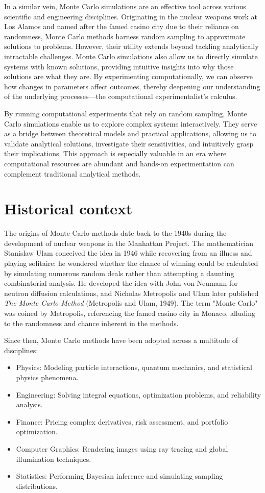 \documentclass[final,5p,times,twocolumn,authoryear]{elsarticle}
\begin{document}
In a similar vein, Monte Carlo simulations are an effective tool across various scientific and engineering disciplines. Originating in the nuclear weapons work at Los Alamos and named after the famed casino city due to their reliance on randomness, Monte Carlo methods harness random sampling to approximate solutions to problems. However, their utility extends beyond tackling analytically intractable challenges. Monte Carlo simulations also allow us to directly simulate systems with known solutions, providing intuitive insights into why those solutions are what they are. By experimenting computationally, we can observe how changes in parameters affect outcomes, thereby deepening our understanding of the underlying processes—the computational experimentalist's calculus.

By running computational experiments that rely on random sampling, Monte Carlo simulations enable us to explore complex systems interactively. They serve as a bridge between theoretical models and practical applications, allowing us to validate analytical solutions, investigate their sensitivities, and intuitively grasp their implications. This approach is especially valuable in an era where computational resources are abundant and hands-on experimentation can complement traditional analytical methods.

\section{Historical context}

The origins of Monte Carlo methods date back to the 1940s during the development of nuclear weapons in the Manhattan Project. The mathematician Stanislaw Ulam conceived the idea in 1946 while recovering from an illness and playing solitaire: he wondered whether the chance of winning could be calculated by simulating numerous random deals rather than attempting a daunting combinatorial analysis. He developed the idea with John von Neumann for neutron diffusion calculations, and Nicholas Metropolis and Ulam later published \textit{The Monte Carlo Method} (Metropolis and Ulam, 1949). The term "Monte Carlo" was coined by Metropolis, referencing the famed casino city in Monaco, alluding to the randomness and chance inherent in the methods.

Since then, Monte Carlo methods have been adopted across a multitude of disciplines:

\begin{itemize}
\itemsep0em
  \item Physics: Modeling particle interactions, quantum mechanics, and statistical physics phenomena.
  \item Engineering: Solving integral equations, optimization problems, and reliability analysis.
  \item Finance: Pricing complex derivatives, risk assessment, and portfolio optimization.
  \item Computer Graphics: Rendering images using ray tracing and global illumination techniques.
  \item Statistics: Performing Bayesian inference and simulating sampling distributions.
\end{itemize}
\end{document}
